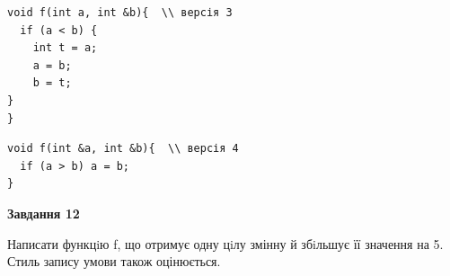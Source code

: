 \documentclass[12pt, ukrainian]{article}
\begin{document}
{\begin {large}
\begin{minipage}[t]{11.0cm}
\vspace{-8mm}\begin{verbatim}
void f(int a, int &b){  \\ версія 3
  if (a < b) {
    int t = a;
    a = b;
    b = t;
}  
}
\end{verbatim}

\vspace{-8mm}\begin{verbatim}
void f(int &a, int &b){  \\ версія 4
  if (a > b) a = b;
}
\end{verbatim}



\begin{center}
\textbf{Завдання 12}
\end{center}

Написати функцiю f, що отримує одну цiлу змінну й збiльшує її значення на 5. Стиль запису умови також оцінюється.\par

\end{minipage}

\end {large}}
\newpage
\end{document}
